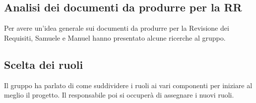 \documentclass[a4paper]{article}
\begin{document}
        \subsection{Analisi dei documenti da produrre per la RR}
        Per avere un'idea generale sui documenti da produrre per la Revisione dei Requisiti,
        Samuele e Manuel hanno presentato alcune ricerche al gruppo.

        \subsection{Scelta dei ruoli}
        Il gruppo ha parlato di come suddividere i ruoli ai vari componenti per iniziare al meglio il progetto. Il responsabile poi si occuperà di assegnare i nuovi ruoli.
\end{document}

